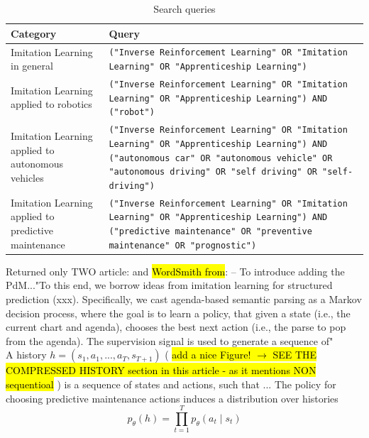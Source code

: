 \documentclass{article}
\newcommand{\hlc}[2][blue!10]{{\colorlet{foo}{#1} \sethlcolor{foo}\hl{#2}}}
\begin{document}
\begingroup
\setlength{\tabcolsep}{6pt}
\begin{table}[h!]
	\renewcommand{\arraystretch}{2.0}
	\selectfont
	\begin{tabular}{L{3cm} L{10cm}}
		\midrule[0.01pt]
		\textbf{Category} & \textbf{Query} \\ \midrule[0.01pt]
		Imitation Learning in general &  \texttt{("Inverse Reinforcement Learning" OR "Imitation Learning" OR "Apprenticeship Learning")} \\
		Imitation Learning applied to robotics &  \texttt{("Inverse Reinforcement Learning" OR "Imitation Learning" OR "Apprenticeship Learning") AND ("robot")} \\
		Imitation Learning applied to autonomous vehicles &  \texttt{("Inverse Reinforcement Learning" OR "Imitation Learning" OR "Apprenticeship Learning") AND ("autonomous car" OR "autonomous vehicle" OR "autonomous driving" OR "self driving" OR "self-driving")} \\ 
		Imitation Learning applied to predictive maintenance &  \texttt{("Inverse Reinforcement Learning" OR "Imitation Learning" OR "Apprenticeship Learning") AND ("predictive maintenance" OR "preventive maintenance" OR "prognostic")} \\ 
		\midrule[0.01pt]
	\end{tabular}
	\caption{Search queries} \label{tbl:SLRQueries}
\end{table}
\endgroup







Returned only TWO article: \cite{Chen-2021-Temporal} and \cite{Pinciroli2022-752} 	
\hlc{WordSmith from}: \cite{berant2015imitation} -- To introduce adding the PdM..."To this end, we borrow ideas from imitation learning for structured prediction (xxx). Specifically, we cast agenda-based semantic parsing as a Markov decision process, where the goal is to learn a policy, that given a state (i.e., the current chart and agenda), chooses the best next action (i.e., the parse to pop from the agenda). The supervision signal is used to generate a sequence of"\\
A history $h = (s_1, a_1, . . . , a_T, s_{T+1})$ (\hlc{add a nice Figure! $\rightarrow$ SEE THE COMPRESSED HISTORY section in this article - as it mentions NON sequentioal }) is a sequence of states and actions, such that ... The policy for choosing predictive maintenance actions induces a distribution over histories \\
\begin{equation}
	p_{\theta}(h) = \prod^{T}_{t=1} p_\theta (a_t \mid s_t)    
\end{equation}
\end{document}
